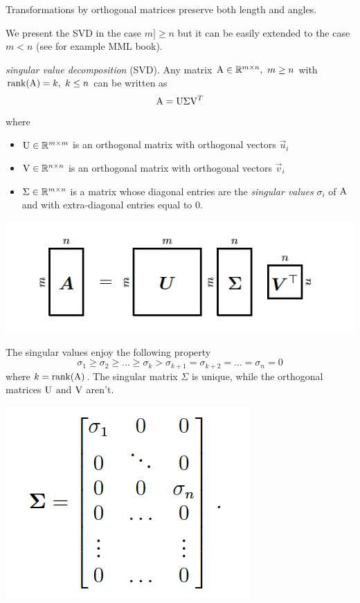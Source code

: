 Transformations by orthogonal matrices preserve both length and angles.

We present the SVD in the case $m ]\geq n$ but it can be easily extended to the case $m<n$ (see for example MML book).
\begin{proposition}
\textit{singular value decomposition} (SVD).
Any matrix $\mathrm{A} \in \mathbb{R}^{m \times n},\ m \geq n$ with $\mathrm{rank}(\mathrm{A}) = k,\ k \leq n$ can be written as
$$ \mathrm{A} = \mathrm{U}\mathrm{\Sigma}\mathrm{V}^T $$
where
\begin{itemize}
    \item $\mathrm{U} \in \mathbb{R}^{m \times m}$ is an orthogonal matrix with orthogonal vectors $\vec{u}_i$
    \item $\mathrm{V} \in \mathbb{R}^{n \times n}$ is an orthogonal matrix with orthogonal vectors $\vec{v}_i$
    \item $\Sigma \in \mathbb{R}^{m \times n}$ is a matrix whose diagonal entries are the \textit{singular values} $\sigma_i$ of $\mathrm{A}$ and with extra-diagonal entries equal to 0.
\end{itemize}
\end{proposition}

\includegraphics[width=0.7 \textwidth]{sections/images/svd.png}

 The singular values enjoy the following property
    $$ \sigma_1 \geq \sigma_2 \geq \hdots \geq \sigma_k > \sigma_{k+1} = \sigma_{k+2} = \hdots = \sigma_{n} = 0 $$
    where $k = \mathrm{rank}(\mathrm{A})$. The singular matrix $\Sigma$ is unique, while the orthogonal matrices $\mathrm{U}$ and $\mathrm{V}$ aren't.

\includegraphics[width=0.5 \textwidth]{sections/images/svd1.png}

